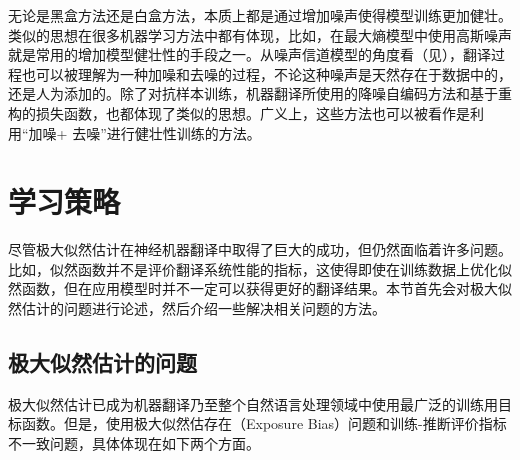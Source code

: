 \parinterval 无论是黑盒方法还是白盒方法，本质上都是通过增加噪声使得模型训练更加健壮。类似的思想在很多机器学习方法中都有体现，比如，在最大熵模型中使用高斯噪声就是常用的增加模型健壮性的手段之一。从噪声信道模型的角度看（见{\chapterfive}），翻译过程也可以被理解为一种加噪和去噪的过程，不论这种噪声是天然存在于数据中的，还是人为添加的。除了对抗样本训练，机器翻译所使用的降噪自编码方法和基于重构的损失函数，也都体现了类似的思想。广义上，这些方法也可以被看作是利用“加噪+ 去噪”进行健壮性训练的方法。


\sectionnewpage
\section{学习策略}

\parinterval 尽管极大似然估计在神经机器翻译中取得了巨大的成功，但仍然面临着许多问题。比如，似然函数并不是评价翻译系统性能的指标，这使得即使在训练数据上优化似然函数，但在应用模型时并不一定可以获得更好的翻译结果。本节首先会对极大似然估计的问题进行论述，然后介绍一些解决相关问题的方法。


\subsection{极大似然估计的问题}\label{subsec-13.3.1}

\parinterval 极大似然估计已成为机器翻译乃至整个自然语言处理领域中使用最广泛的训练用目标函数。但是，使用极大似然估存在{\small{}}（Exposure Bias）问题和训练-推断评价指标不一致问题，具体体现在如下两个方面。

